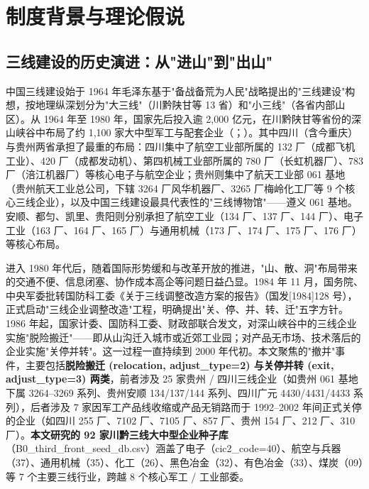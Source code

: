 \section{制度背景与理论假说}\label{sec:bg}

\subsection{三线建设的历史演进：从"进山"到"出山"}

中国三线建设始于 1964 年毛泽东基于"备战备荒为人民"战略提出的"三线建设"构想，按地理纵深划分为"大三线"（川黔陕甘等 13 省）和"小三线"（各省内部山区）。从 1964 年至 1980 年，国家先后投入逾 2{,}000 亿元，在川黔陕甘等省份的深山峡谷中布局了约 1{,}100 家大中型军工与配套企业（\citet{陈东林2003}；\citet{董志凯2003}）。其中四川（含今重庆）与贵州两省承担了最重的布局：四川集中了航空工业部所属的 132 厂（成都飞机工业）、420 厂（成都发动机）、第四机械工业部所属的 780 厂（长虹机器厂）、783 厂（涪江机器厂）等核心电子与航空企业；贵州则集中了航天工业部 061 基地（贵州航天工业总公司，下辖 3264 厂风华机器厂、3265 厂梅岭化工厂等 9 个核心三线企业），以及中国三线建设最具代表性的"三线博物馆"——遵义 061 基地。安顺、都匀、凯里、贵阳则分别承担了航空工业（134 厂、137 厂、144 厂）、电子工业（163 厂、164 厂、165 厂）与通用机械（173 厂、174 厂、175 厂、176 厂）等核心布局。

进入 1980 年代后，随着国际形势缓和与改革开放的推进，"山、散、洞"布局带来的交通不便、信息闭塞、协作成本高企等问题日益凸显。1984 年 11 月，国务院、中央军委批转国防科工委《关于三线调整改造方案的报告》（国发[1984]128 号），正式启动"三线企业调整改造"工程，明确提出"关、停、并、转、迁"五字方针。1986 年起，国家计委、国防科工委、财政部联合发文，对深山峡谷中的三线企业实施"脱险搬迁"——即从山沟迁入城市或近郊工业园；对产品无市场、技术落后的企业实施"关停并转"。这一过程一直持续到 2000 年代初。本文聚焦的"撤并"事件，主要包括\textbf{脱险搬迁 (relocation, adjust\_type=2) 与关停并转 (exit, adjust\_type=3) 两类}，前者涉及 25 家贵州 / 四川三线企业（如贵州 061 基地下属 3264--3269 系列、贵州安顺 134/137/144 系列、四川广元 4430/4431/4433 系列），后者涉及 7 家因军工产品线收缩或产品无销路而于 1992--2002 年间正式关停的企业（如四川 255 厂、7102 厂、7105 厂、857 厂、贵州 154 厂、212 厂、310 厂）。\textbf{本文研究的 92 家川黔三线大中型企业种子库}（B0\_third\_front\_seed\_db.csv）涵盖了电子（cic2\_code=40）、航空与兵器（37）、通用机械（35）、化工（26）、黑色冶金（32）、有色冶金（33）、煤炭（09）等 7 个主要三线行业，跨越 8 个核心军工 / 工业部委。

